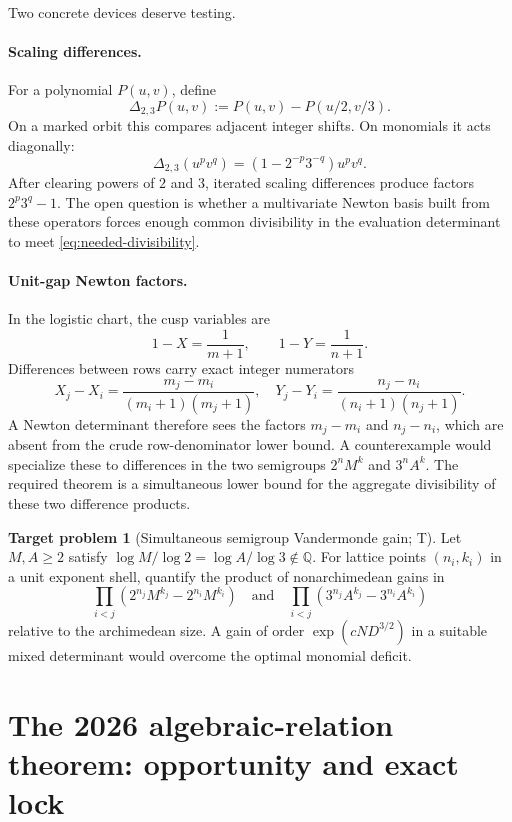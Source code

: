 \documentclass[10pt,oneside]{article}
\theoremstyle{definition}
\newtheorem{problem}[theorem]{Target problem}
\theoremstyle{remark}
\newcommand{\Q}{\mathbb Q}
\newcommand{\statusT}{\textsc{T}}
\begin{document}
Two concrete devices deserve testing.

\paragraph{Scaling differences.}
For a polynomial \(P(u,v)\), define
\[
 \Delta_{2,3}P(u,v):=P(u,v)-P(u/2,v/3).
\]
On a marked orbit this compares adjacent integer shifts.  On monomials it acts diagonally:
\[
 \Delta_{2,3}(u^pv^q)=(1-2^{-p}3^{-q})u^pv^q.
\]
After clearing powers of \(2\) and \(3\), iterated scaling differences produce factors \(2^p3^q-1\).  The open question is whether a multivariate Newton basis built from these operators forces enough common divisibility in the evaluation determinant to meet \eqref{eq:needed-divisibility}.

\paragraph{Unit-gap Newton factors.}
In the logistic chart, the cusp variables are
\[
 1-X=\frac1{m+1},\qquad 1-Y=\frac1{n+1}.
\]
Differences between rows carry exact integer numerators
\[
 X_j-X_i=\frac{m_j-m_i}{(m_i+1)(m_j+1)},
 \quad
 Y_j-Y_i=\frac{n_j-n_i}{(n_i+1)(n_j+1)}.
\]
A Newton determinant therefore sees the factors \(m_j-m_i\) and \(n_j-n_i\), which are absent from the crude row-denominator lower bound.  A counterexample would specialize these to differences in the two semigroups \(2^nM^k\) and \(3^nA^k\).  The required theorem is a simultaneous lower bound for the aggregate divisibility of these two difference products.

\begin{problem}[Simultaneous semigroup Vandermonde gain; \statusT]
\label{prob:semigroup-vandermonde}
Let \(M,A\ge2\) satisfy \(\log M/\log2=\log A/\log3\notin\Q\).  For lattice points \((n_i,k_i)\) in a unit exponent shell, quantify the product of nonarchimedean gains in
\[
 \prod_{i<j}(2^{n_j}M^{k_j}-2^{n_i}M^{k_i})
 \quad\text{and}\quad
 \prod_{i<j}(3^{n_j}A^{k_j}-3^{n_i}A^{k_i})
\]
relative to the archimedean size.  A gain of order \(\exp(cND^{3/2})\) in a suitable mixed determinant would overcome the optimal monomial deficit.
\end{problem}


\section{The 2026 algebraic-relation theorem: opportunity and exact lock}
\label{sec:relation-counting}
\end{document}
